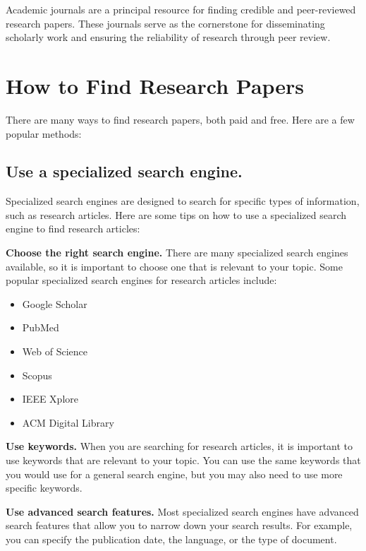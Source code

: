 \documentclass[
]{book}
\begin{document}
Academic journals are a principal resource for finding credible and peer-reviewed research papers. These journals serve as the cornerstone for disseminating scholarly work and ensuring the reliability of research through peer review.

\section{How to Find Research Papers}\label{find}

There are many ways to find research papers, both paid and free. Here are a few popular methods:

\subsection*{Use a specialized search engine.}\label{use-a-specialized-search-engine.}

Specialized search engines are designed to search for specific types of information, such as research articles. Here are some tips on how to use a specialized search engine to find research articles:

\textbf{Choose the right search engine.} There are many specialized search engines available, so it is important to choose one that is relevant to your topic. Some popular specialized search engines for research articles include:

\begin{itemize}
\item
  Google Scholar
\item
  PubMed
\item
  Web of Science
\item
  Scopus
\item
  IEEE Xplore
\item
  ACM Digital Library
\end{itemize}

\textbf{Use keywords.} When you are searching for research articles, it is important to use keywords that are relevant to your topic. You can use the same keywords that you would use for a general search engine, but you may also need to use more specific keywords.

\textbf{Use advanced search features.} Most specialized search engines have advanced search features that allow you to narrow down your search results. For example, you can specify the publication date, the language, or the type of document.
\end{document}
